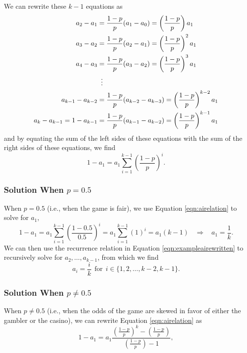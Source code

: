 \documentclass[a4paper,11pt]{article}
\begin{document}
We can rewrite these $k-1$ equations as
\begin{align}
a_2 - a_1 &= \frac{1-p}{p} (a_1 - a_0) = \left(\frac{1-p}{p}\right) a_1 \nonumber
\\
a_3 - a_2 &= \frac{1-p}{p} (a_2 - a_1) = \left(\frac{1-p}{p}\right)^2 a_1 \nonumber
\\
a_4 - a_3 &= \frac{1-p}{p} (a_3 - a_2) = \left(\frac{1-p}{p}\right)^3 a_1 \nonumber
\\
& \vdotswithin{=} \nonumber
\\
a_{k-1} - a_{k-2} &= \frac{1-p}{p} (a_{k-2} - a_{k-3}) = \left(\frac{1-p}{p}\right)^{k-2} a_1 \nonumber
\\
a_{k} - a_{k-1} = 1 - a_{k-1} &= \frac{1-p}{p} (a_{k-1} - a_{k-2}) = \left(\frac{1-p}{p}\right)^{k-1} a_1
\label{eqn:exampleairewritten}
\end{align}
and by equating the sum of the left sides of these equations with the sum of the right sides of these equations, we find
\begin{equation}
1-a_1 = a_1 \sum_{i=1}^{k-1} \left( \frac{1-p}{p} \right)^i .
\label{eqn:airelation}
\end{equation}

\subsubsection{Solution When $p=0.5$}
\label{sec:solnfiargame}

When $p=0.5$ (i.e., when the game is fair), we use Equation \ref{eqn:airelation} to solve for $a_1$,
\begin{equation}
1-a_1 = a_1 \sum_{i=1}^{k-1} \left( \frac{1-0.5}{0.5} \right)^i = a_1 \sum_{i=1}^{k-1} \left( 1 \right)^i = a_1 \left(k-1\right) \ \ \ \ \Rightarrow \ \ \ \ a_1 = \frac{1}{k}.
\end{equation}
We can then use the recurrence relation in Equation \ref{eqn:exampleairewritten} to recursively solve for $a_2, \ldots, a_{k-1}$, from which we find
\begin{equation}
a_i = \frac{i}{k} \ \ \mathrm{for} \ \ i \in \{ 1, 2, \ldots, k-2, k-1 \}.
\end{equation}




\subsubsection{Solution When $p\neq0.5$}
When $p\neq0.5$ (i.e., when the odds of the game are skewed in favor of either the gambler or the casino), we can rewrite Equation \ref{eqn:airelation} as
\begin{equation}
1-a_1 = a_1 \frac{ \left(\frac{1-p}{p}\right)^k - \left(\frac{1-p}{p}\right) }{ \left(\frac{1-p}{p}\right) - 1 },
\end{equation}
\end{document}
